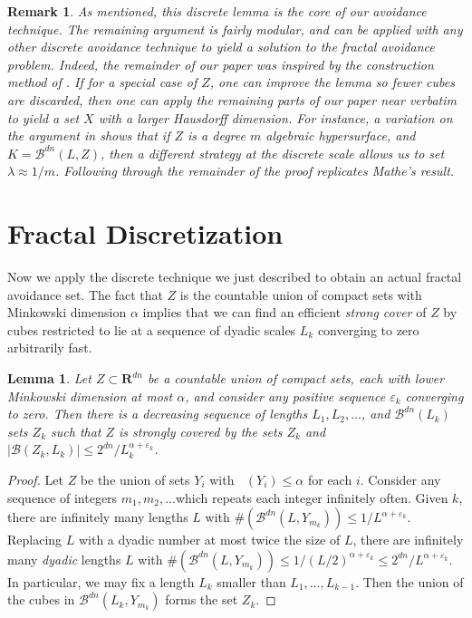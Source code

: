\documentclass[usenames,dvipsnames]{article}
\theoremstyle{plain}
\newtheorem{lemma}{Lemma}
\theoremstyle{plain}
\newtheorem*{remark}{Remark}
\DeclareMathOperator{\lhdim}{\underline{\dim}_{\mathbf{M}}}
\begin{document}
\begin{remark}
	As mentioned, this discrete lemma is the core of our avoidance technique. The remaining argument is fairly modular, and can be applied with any other discrete avoidance technique to yield a solution to the fractal avoidance problem. Indeed, the remainder of our paper was inspired by the construction method of \cite{MalabikaRob}. If for a special case of $Z$, one can improve the lemma so fewer cubes are discarded, then one can apply the remaining parts of our paper near verbatim to yield a set $X$ with a larger Hausdorff dimension. For instance, a variation on the argument in \cite{Mathe} shows that if $Z$ is a degree $m$ algebraic hypersurface, and $K = \mathcal{B}^{dn}(L,Z)$, then a different strategy at the discrete scale allows us to set $\lambda \approx 1/m$. Following through the remainder of the proof replicates Mathe's result.
\end{remark}

\section{Fractal Discretization}

Now we apply the discrete technique we just described to obtain an actual fractal avoidance set. The fact that $Z$ is the countable union of compact sets with Minkowski dimension $\alpha$ implies that we can find an efficient {\it strong cover} of $Z$ by cubes restricted to lie at a sequence of dyadic scales $L_k$ converging to zero arbitrarily fast.

\begin{lemma}
	Let $Z \subset \mathbf{R}^{dn}$ be a countable union of compact sets, each with lower Minkowski dimension at most $\alpha$, and consider any positive sequence $\varepsilon_k$ converging to zero. Then there is a decreasing sequence of lengths $L_1, L_2, \dots$, and $\mathcal{B}^{dn}(L_k)$ sets $Z_k$ such that $Z$ is strongly covered by the sets $Z_k$ and $|\mathcal{B}(Z_k, L_k)| \leq 2^{dn}/L_k^{\alpha + \varepsilon_k}$.
\end{lemma}
\begin{proof}
	Let $Z$ be the union of sets $Y_i$ with $\lhdim(Y_i) \leq \alpha$ for each $i$. Consider any sequence of integers $m_1, m_2, \dots$which repeats each integer infinitely often. Given $k$, there are infinitely many lengths $L$ with $\#(\mathcal{B}^{dn}(L,Y_{m_k})) \leq 1/L^{\alpha + \varepsilon_k}$. Replacing $L$ with a dyadic number at most twice the size of $L$, there are infinitely many {\it dyadic} lengths $L$ with $\# (\mathcal{B}^{dn}(L,Y_{m_k})) \leq 1/(L/2)^{\alpha + \varepsilon_k} \leq 2^{dn}/L^{\alpha + \varepsilon_k}$. In particular, we may fix a length $L_k$ smaller than $L_1, \dots, L_{k-1}$. Then the union of the cubes in $\mathcal{B}^{dn}(L_k,Y_{m_k})$ forms the set $Z_k$.
\end{proof}
\end{document}
